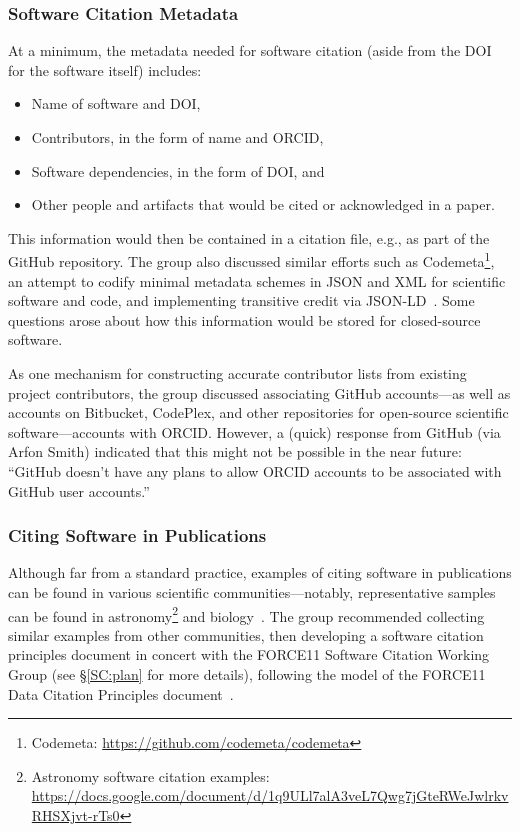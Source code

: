 \subsubsection{Software Citation Metadata}

At a minimum, the metadata needed for software citation (aside from the DOI for the software itself) includes:
\begin{itemize}
    \item Name of software and DOI,
    \item Contributors, in the form of name and ORCID,
    \item Software dependencies, in the form of DOI, and
    \item Other people and artifacts that would be cited or acknowledged in a paper.
\end{itemize}
This information would then be contained in a citation file, e.g.,  as part of 
the GitHub repository.
The group also discussed similar efforts such as Codemeta\footnote{Codemeta: \url{https://github.com/codemeta/codemeta}}, an attempt to codify minimal 
metadata schemes in JSON and XML for scientific software and code, and 
implementing transitive credit via JSON-LD~\cite{wssspe2_katz}.
Some questions arose about how this information would be stored for 
closed-source software.

As one mechanism for constructing accurate contributor lists from existing 
project contributors, the group discussed associating GitHub accounts---as 
well as accounts on Bitbucket, CodePlex, and other repositories for 
open-source scientific software---accounts with ORCID.
However, a (quick) response from GitHub (via Arfon Smith) indicated that 
this might not be possible in the near future: ``GitHub doesn't have any 
plans to allow ORCID accounts to be associated with GitHub user accounts.''

\subsubsection{Citing Software in Publications}

Although far from a standard practice, examples of citing software in 
publications can be found in various scientific communities---notably, 
representative samples can be found in astronomy\footnote{Astronomy software citation examples: \url{https://docs.google.com/document/d/1q9ULl7alA3veL7Qwg7jGteRWeJwlrkvRHSXjvt-rTs0}} and biology~\cite{Howison2015}.
The group recommended collecting similar examples from other communities, then 
developing a software citation principles document in concert with the 
FORCE11 Software Citation Working Group (see \S\ref{SC:plan} for more details), 
following the model of the FORCE11 Data Citation Principles 
document~\cite{DataCitation2014}.

